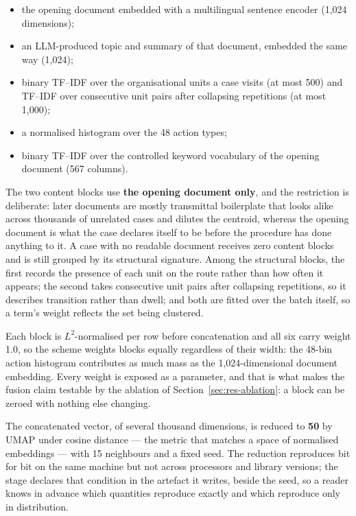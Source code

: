 \begin{itemize}
  \item the opening document embedded with a multilingual sentence encoder \citep{chen2024bgem3} (1{,}024 dimensions);
  \item an LLM-produced topic and summary of that document, embedded the same way (1{,}024);
  \item binary TF--IDF over the organisational units a case visits (at most 500) and TF--IDF over
    consecutive unit pairs after collapsing repetitions (at most 1{,}000);
  \item a normalised histogram over the 48 action types;
  \item binary TF--IDF over the controlled keyword vocabulary of the opening document (567
    columns).
\end{itemize}

The two content blocks use \textbf{the opening document only}, and the restriction is
deliberate: later documents are mostly transmittal boilerplate that looks alike across thousands
of unrelated cases and dilutes the centroid, whereas the opening document is what the case
declares itself to be before the procedure has done anything to it. A case with no readable
document receives zero content blocks and is still grouped by its structural signature. Among the
structural blocks, the first records the presence of each unit on the route rather than how often
it appears; the second takes consecutive unit pairs after collapsing repetitions, so it describes
transition rather than dwell; and both are fitted over the batch itself, so a term's weight
reflects the set being clustered.

Each block is $L^2$-normalised per row before concatenation and all six carry weight 1.0, so the
scheme weights blocks equally regardless of their width: the 48-bin action histogram contributes
as much mass as the 1{,}024-dimensional document embedding. Every weight is exposed as a
parameter, and that is what makes the fusion claim testable by the ablation of
Section~\ref{sec:res-ablation}: a block can be zeroed with nothing else changing.

The concatenated vector, of several thousand dimensions, is reduced to \textbf{50} by UMAP
\citep{mcinnes2018umap} under cosine distance --- the metric that matches a space of normalised
embeddings --- with 15 neighbours and a fixed seed. The reduction reproduces bit for bit on the
same machine but not across processors and library versions; the stage declares that condition in
the artefact it writes, beside the seed, so a reader knows in advance which quantities reproduce
exactly and which reproduce only in distribution.

